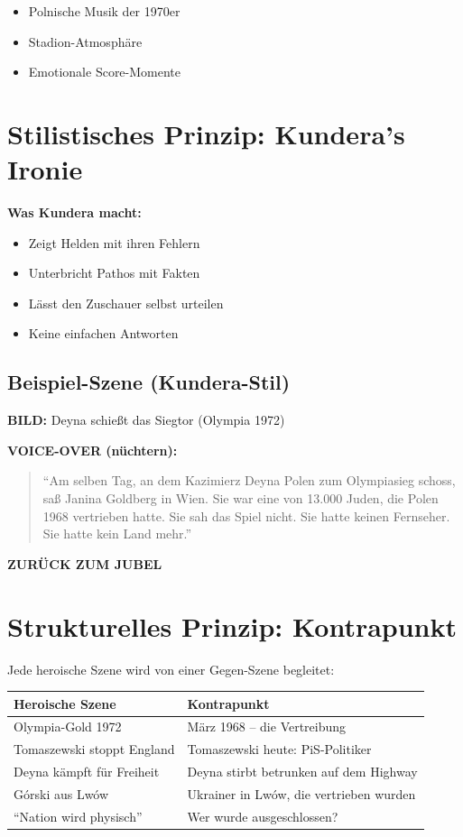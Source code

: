 \documentclass[11pt,a4paper]{book}
\begin{document}
\begin{itemize}
    \item Polnische Musik der 1970er
    \item Stadion-Atmosphäre
    \item Emotionale Score-Momente
\end{itemize}

\section{Stilistisches Prinzip: Kundera's Ironie}

\textbf{Was Kundera macht:}
\begin{itemize}
    \item Zeigt Helden mit ihren Fehlern
    \item Unterbricht Pathos mit Fakten
    \item Lässt den Zuschauer selbst urteilen
    \item Keine einfachen Antworten
\end{itemize}

\subsection{Beispiel-Szene (Kundera-Stil)}

\textbf{BILD:} Deyna schießt das Siegtor (Olympia 1972)

\textbf{VOICE-OVER (nüchtern):}
\begin{quote}
``Am selben Tag, an dem Kazimierz Deyna Polen zum Olympiasieg schoss, saß Janina Goldberg in Wien. Sie war eine von 13.000 Juden, die Polen 1968 vertrieben hatte. Sie sah das Spiel nicht. Sie hatte keinen Fernseher. Sie hatte kein Land mehr.''
\end{quote}

\textbf{ZURÜCK ZUM JUBEL}

\section{Strukturelles Prinzip: Kontrapunkt}

Jede heroische Szene wird von einer Gegen-Szene begleitet:

\begin{longtable}{L{5cm}L{8cm}}
\toprule
\textbf{Heroische Szene} & \textbf{Kontrapunkt} \\
\midrule
\endhead
Olympia-Gold 1972 & März 1968 -- die Vertreibung \\
Tomaszewski stoppt England & Tomaszewski heute: PiS-Politiker \\
Deyna kämpft für Freiheit & Deyna stirbt betrunken auf dem Highway \\
Górski aus Lwów & Ukrainer in Lwów, die vertrieben wurden \\
``Nation wird physisch'' & Wer wurde ausgeschlossen? \\
\bottomrule
\end{longtable}
\end{document}
